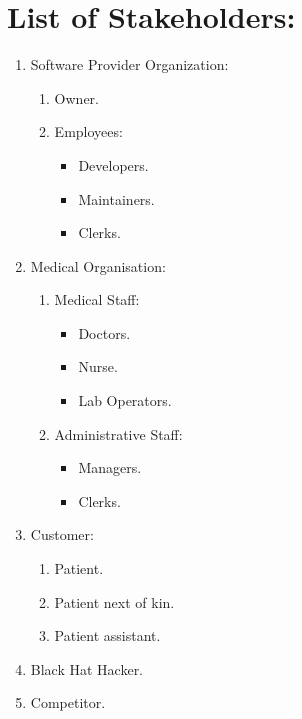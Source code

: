 \documentclass[a4paper,12pt]{report}
\begin{document}
\section*{List of Stakeholders:}
\begin{enumerate}
    \item Software Provider Organization:
        \begin{enumerate}
            \item Owner.
            \item Employees:
                \begin{itemize}
                    \item Developers.
                    \item Maintainers.
                    \item Clerks.
                \end{itemize}
        \end{enumerate}
    \item Medical Organisation:
        \begin{enumerate}
            \item Medical Staff:
                \begin{itemize}
                    \item Doctors.
                    \item Nurse.
                    \item Lab Operators.
                \end{itemize}
            \item Administrative Staff:
                \begin{itemize}
                    \item Managers.
                    \item Clerks.
                \end{itemize}
        \end{enumerate}
    \vspace{1mm}
    \item Customer:
        \begin{enumerate}
            \item Patient.
            \item Patient next of kin.
            \item Patient assistant.
        \end{enumerate}
    \item Black Hat Hacker.
    \item Competitor.
\end{enumerate}
\end{document}

